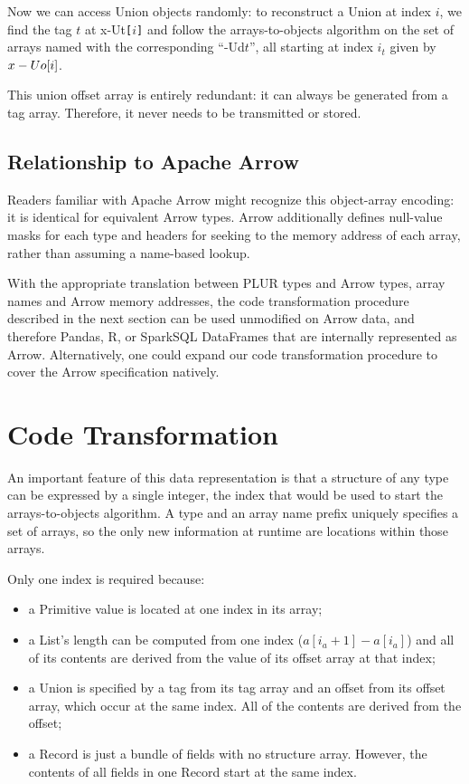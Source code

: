\documentclass[10pt, conference, compsocconf]{IEEEtran}
\begin{document}
Now we can access Union objects randomly: to reconstruct a Union at index $i$, we find the tag $t$ at x-Ut{\tt [}$i${\tt ]} and follow the arrays-to-objects algorithm on the set of arrays named with the corresponding ``-Ud$t$'', all starting at index $i_t$ given by $\mbox{x-Uo{\tt [}}i\mbox{\tt]}$.

This union offset array is entirely redundant: it can always be generated from a tag array. Therefore, it never needs to be transmitted or stored.

\subsection{Relationship to Apache Arrow}

Readers familiar with Apache Arrow might recognize this object-array encoding\cite{arrow-layout}: it is identical for equivalent Arrow types. Arrow additionally defines null-value masks for each type and headers for seeking to the memory address of each array, rather than assuming a name-based lookup.

With the appropriate translation between PLUR types and Arrow types, array names and Arrow memory addresses, the code transformation procedure described in the next section can be used unmodified on Arrow data, and therefore Pandas\cite{pandas}, R\cite{R}, or SparkSQL\cite{sparksql} DataFrames that are internally represented as Arrow. Alternatively, one could expand our code transformation procedure to cover the Arrow specification natively.

\section{Code Transformation}

An important feature of this data representation is that a structure of any type can be expressed by a single integer, the index that would be used to start the arrays-to-objects algorithm. A type and an array name prefix uniquely specifies a set of arrays, so the only new information at runtime are locations within those arrays.

Only one index is required because:
\begin{itemize}
\item a Primitive value is located at one index in its array;
\item a List's length can be computed from one index \mbox{($a[i_a + 1] - a[i_a]$)} and all of its contents are derived from the value of its offset array at that index;
\item a Union is specified by a tag from its tag array and an offset from its offset array, which occur at the same index. All of the contents are derived from the offset;
\item a Record is just a bundle of fields with no structure array. However, the contents of all fields in one Record start at the same index.
\end{itemize}
\end{document}
